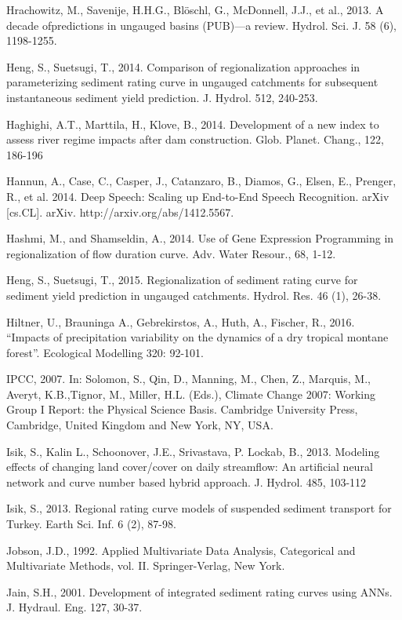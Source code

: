 \begin{hangingpar}{2em}
Hrachowitz, M., Savenije, H.H.G., Blöschl, G., McDonnell, J.J., et al., 2013. A decade ofpredictions in ungauged basins (PUB)—a review. Hydrol. Sci. J. 58 (6), 1198-1255.

Heng, S., Suetsugi, T., 2014. Comparison of regionalization approaches in parameterizing sediment rating curve in ungauged catchments for subsequent instantaneous sediment yield prediction. J. Hydrol. 512, 240-253.

Haghighi, A.T., Marttila, H., Klove, B., 2014. Development of a new index to assess river regime impacts after dam construction. Glob. Planet. Chang., 122, 186-196

Hannun, A., Case, C., Casper, J.,  Catanzaro, B., Diamos, G., Elsen, E., Prenger, R., et al. 2014. Deep Speech: Scaling up End-to-End Speech Recognition. arXiv [cs.CL]. arXiv. http://arxiv.org/abs/1412.5567.

Hashmi, M., and Shamseldin, A., 2014. Use of Gene Expression Programming in regionalization of flow duration curve. Adv. Water Resour., 68, 1-12.

Heng, S., Suetsugi, T., 2015. Regionalization of sediment rating curve for sediment yield prediction in ungauged catchments. Hydrol. Res. 46 (1), 26-38.

Hiltner, U.,  Brauninga A.,  Gebrekirstos, A., Huth, A.,  Fischer, R., 2016. ``Impacts of precipitation variability on the dynamics of a dry tropical montane forest''. Ecological Modelling 320: 92-101.

IPCC, 2007. In: Solomon, S., Qin, D., Manning, M., Chen, Z., Marquis, M., Averyt, K.B.,Tignor, M., Miller, H.L. (Eds.), Climate Change 2007: Working Group I Report: the Physical Science Basis. Cambridge University Press, Cambridge, United Kingdom and New York, NY, USA.

Isik, S., Kalin L., Schoonover, J.E., Srivastava, P.  Lockab, B., 2013.  Modeling effects of changing land cover/cover on daily streamflow: An artificial neural network and curve number based hybrid approach.  J. Hydrol. 485, 103-112

Isik, S., 2013. Regional rating curve models of suspended sediment transport for Turkey. Earth Sci. Inf. 6 (2), 87-98.

Jobson, J.D., 1992. Applied Multivariate Data Analysis, Categorical and Multivariate Methods, vol. II. Springer-Verlag, New York.

Jain, S.H., 2001. Development of integrated sediment rating curves using ANNs. J. Hydraul. Eng. 127, 30-37.


\end{hangingpar}
